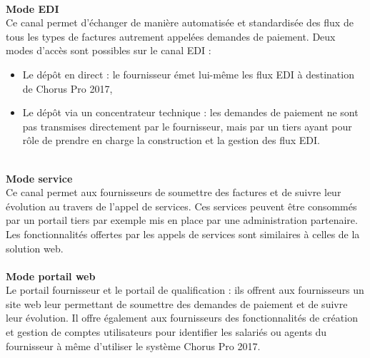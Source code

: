 \documentclass[12pt,a4paper]{article}
\begin{document}
~~\\
\textbf{Mode EDI}
~~\\
Ce canal permet d’échanger de manière automatisée et standardisée des flux de tous les types de factures autrement appelées demandes de paiement. Deux modes d’accès sont possibles sur le canal EDI :
\smallbreak
\begin{itemize}
\item Le dépôt en direct : le fournisseur émet lui-même les flux EDI à destination de Chorus Pro 2017,
\item Le dépôt via un concentrateur technique : les demandes de paiement ne sont pas transmises directement par le fournisseur, mais par un tiers ayant pour rôle de prendre en charge la construction et la gestion des flux EDI. 
\end{itemize}
~~\\
\textbf{Mode service}
~~\\
Ce canal permet aux fournisseurs de soumettre des factures et de suivre leur évolution au travers de l'appel de services. Ces services peuvent être consommés par un portail tiers par exemple mis en place par une administration partenaire. Les fonctionnalités offertes par les appels de services sont similaires à celles de la solution web.
~~\\
~~\\
\textbf{Mode portail web}
~~\\
Le portail fournisseur et le portail de qualification : ils offrent aux fournisseurs un site web leur permettant de soumettre des demandes de paiement et de suivre leur évolution. Il offre également aux fournisseurs des fonctionnalités de création et gestion de comptes utilisateurs pour identifier les salariés ou agents du fournisseur à même d’utiliser le système Chorus Pro 2017.
\clearpage
\newpage
\end{document}
